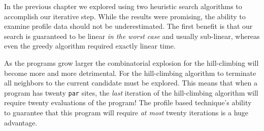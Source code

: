 In the previous chapter we explored using two heuristic search algorithms to
accomplish our iterative step. While the results were promising, the ability to
examine profile data should not be underestimated. The first benefit is that
our search is guaranteed to be linear \emph{in the worst case} and usually
sub-linear, whereas even the greedy algorithm required exactly linear time.

As the programs grow larger the combinatorial explosion for the hill-climbing
will become more and more detrimental. For the hill-climbing algorithm to
terminate all neighbors to the current candidate must be explored. This means
that when a program has twenty \verb|par| sites, the \emph{last} iteration of
the hill-climbing algorithm will require twenty evaluations of the program! The
profile based technique's ability to guarantee that this program will require
\emph{at most} twenty iterations is a huge advantage.
